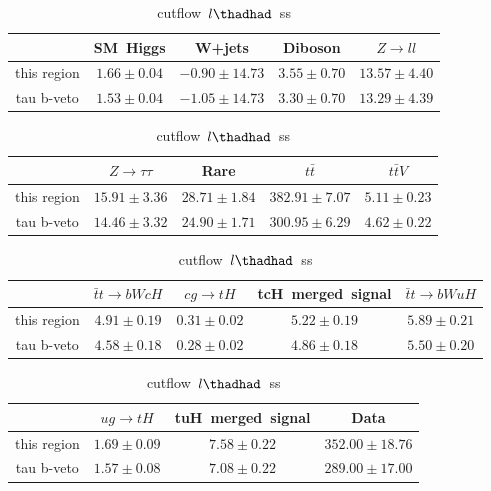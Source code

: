 \begin{table}
\caption{cutflow~$l\thadhad$~ss}
\centering
\begin{tabular}{|c|c|c|c|c|} \hline
 & SM~Higgs & W+jets & Diboson & $Z\to ll$\\\hline
this region & $1.66\pm0.04$ & $-0.90\pm14.73$ & $3.55\pm0.70$ & $13.57\pm4.40$\\\hline
tau b-veto & $1.53\pm0.04$ & $-1.05\pm14.73$ & $3.30\pm0.70$ & $13.29\pm4.39$\\\hline
\end{tabular}
\begin{tabular}{|c|c|c|c|c|} \hline
 & $Z\to \tau\tau$ & Rare & $t\bar{t}$ & $t\bar{t}V$\\\hline
this region & $15.91\pm3.36$ & $28.71\pm1.84$ & $382.91\pm7.07$ & $5.11\pm0.23$\\\hline
tau b-veto & $14.46\pm3.32$ & $24.90\pm1.71$ & $300.95\pm6.29$ & $4.62\pm0.22$\\\hline
\end{tabular}
\begin{tabular}{|c|c|c|c|c|} \hline
 & $\bar{t}t\to bWcH$ & $cg\to tH$ & tcH~merged~signal & $\bar{t}t\to bWuH$\\\hline
this region & $4.91\pm0.19$ & $0.31\pm0.02$ & $5.22\pm0.19$ & $5.89\pm0.21$\\\hline
tau b-veto & $4.58\pm0.18$ & $0.28\pm0.02$ & $4.86\pm0.18$ & $5.50\pm0.20$\\\hline
\end{tabular}
\begin{tabular}{|c|c|c|c|} \hline
 & $ug\to tH$ & tuH~merged~signal & Data\\\hline
this region & $1.69\pm0.09$ & $7.58\pm0.22$ & $352.00\pm18.76$\\\hline
tau b-veto & $1.57\pm0.08$ & $7.08\pm0.22$ & $289.00\pm17.00$\\\hline
\end{tabular}
\label{tab:cutflow_reg1l2tau1bnj_ss}
\end{table}
